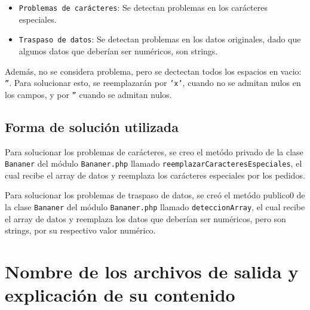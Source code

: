 \documentclass[12pt]{article}
\begin{document}
\begin{itemize}
    \item \texttt{Problemas de carácteres}: Se detectan problemas en los carácteres especiales.
    \item \texttt{Traspaso de datos}: Se detectan problemas en los datos originales, dado que algunos datos que deberían ser numéricos, son strings.
\end{itemize}

Además, no se considera problema, pero se dectectan todos los espacios en vacio: \texttt{''}. Para solucionar esto, se 
reemplazarán por \texttt{'x'}, cuando no se admitan nulos en los campos, y por \texttt{''} cuando se admitan nulos.


\subsection*{Forma de solución utilizada}

Para solucionar los problemas de carácteres, se creo el metódo privado de la clase \texttt{Bananer} del módulo \texttt{Bananer.php}	
llamado \texttt{reemplazarCaracteresEspeciales}, el cual recibe el array de datos y reemplaza los carácteres especiales por los pedidos. 

Para solucionar los problemas de traspaso de datos, se creó el metódo publico0 de la clase \texttt{Bananer} del módulo 
\texttt{Bananer.php} llamado \texttt{deteccionArray}, el cual recibe el array de datos y reemplaza los datos que deberían ser numéricos, pero son strings, por su respectivo valor numérico.

\section*{Nombre de los archivos de salida y explicación de su contenido}
\end{document}

